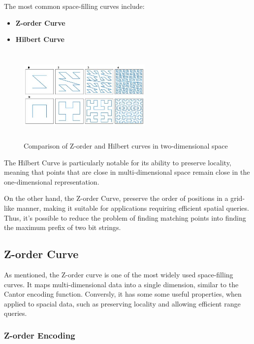 \documentclass[12pt,a4paper,twoside]{book}
\begin{document}
The most common space-filling curves include:
\begin{itemize}
    \item \textbf{Z-order Curve}
    \item \textbf{Hilbert Curve}
\end{itemize}

\vspace{5mm}

\begin{figure}[h]
    \centering
    \includegraphics[width=6.5cm,height=4.7cm]{img/hilbert-z-order.jpg}
    \caption{Comparison of Z-order and Hilbert curves in two-dimensional space}
    \label{fig:space-filling}
\end{figure}

\vspace{5mm}

The Hilbert Curve is particularly notable for its ability to preserve locality, meaning that points that are close in multi-dimensional space remain close in the one-dimensional representation.

On the other hand, the Z-order Curve, preserve the order of positions in a grid-like manner, making it suitable for applications requiring efficient spatial queries. Thus, it's possible to reduce the problem of finding matching points into finding the maximum prefix of two bit strings.

\subsection{Z-order Curve}
As mentioned, the Z-order curve is one of the most widely used space-filling curves. It maps multi-dimensional data into a single dimension, similar to the Cantor encoding function. Conversly, it has some some useful properties, when applied to spacial data, such as preserving locality and allowing efficient range queries.

\subsubsection{Z-order Encoding}
\end{document}
